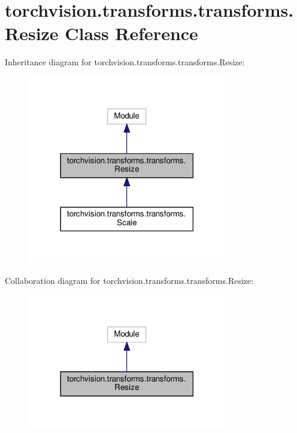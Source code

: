 \hypertarget{classtorchvision_1_1transforms_1_1transforms_1_1Resize}{}\section{torchvision.\+transforms.\+transforms.\+Resize Class Reference}
\label{classtorchvision_1_1transforms_1_1transforms_1_1Resize}


Inheritance diagram for torchvision.\+transforms.\+transforms.\+Resize\+:
\nopagebreak
\begin{figure}[H]
\begin{center}
\leavevmode
\includegraphics[width=246pt]{classtorchvision_1_1transforms_1_1transforms_1_1Resize__inherit__graph}
\end{center}
\end{figure}


Collaboration diagram for torchvision.\+transforms.\+transforms.\+Resize\+:
\nopagebreak
\begin{figure}[H]
\begin{center}
\leavevmode
\includegraphics[width=246pt]{classtorchvision_1_1transforms_1_1transforms_1_1Resize__coll__graph}
\end{center}
\end{figure}
